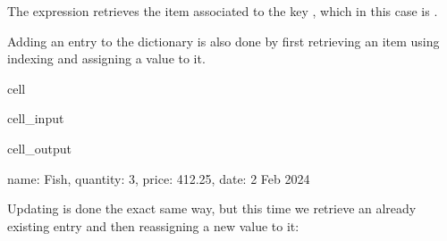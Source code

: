 \documentclass[letterpaper,10pt,english]{jupyterBook}
\begin{document}
\sphinxAtStartPar
The expression  retrieves the item associated to the key , which in this case is .

\sphinxAtStartPar
Adding an entry to the dictionary is also done by first retrieving an item using indexing and assigning a value to it.

\begin{sphinxuseclass}{cell}\begin{sphinxVerbatimInput}

\begin{sphinxuseclass}{cell_input}
\begin{sphinxVerbatim}[commandchars=\\\{\}]
\PYG{p}{[}\PYG{p}{]}  
\end{sphinxVerbatim}

\end{sphinxuseclass}\end{sphinxVerbatimInput}
\begin{sphinxVerbatimOutput}

\begin{sphinxuseclass}{cell_output}
\begin{sphinxVerbatim}[commandchars=\\\{\}]
\PYGZob{}\PYGZsq{}name\PYGZsq{}: \PYGZsq{}Fish\PYGZsq{}, \PYGZsq{}quantity\PYGZsq{}: 3, \PYGZsq{}price\PYGZsq{}: 412.25, \PYGZsq{}date\PYGZsq{}: \PYGZsq{}2 Feb 2024\PYGZsq{}\PYGZcb{}
\end{sphinxVerbatim}

\end{sphinxuseclass}\end{sphinxVerbatimOutput}

\end{sphinxuseclass}
\sphinxAtStartPar
Updating is done the exact same way, but this time we retrieve an already existing entry and then reassigning a new value to it:
\end{document}
